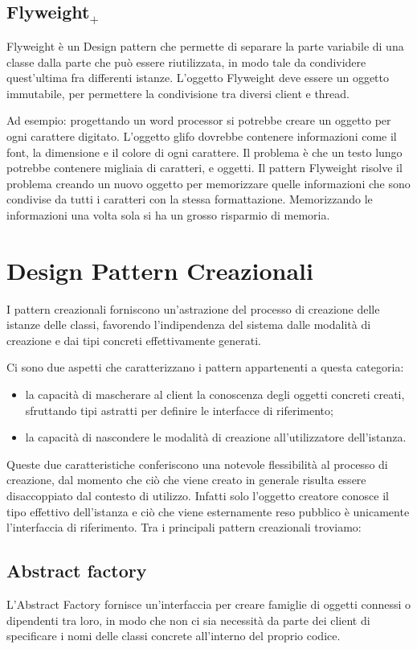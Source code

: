 \subsection{Flyweight$_+$}
Flyweight è un Design pattern che permette di separare la parte variabile di una classe dalla parte che può essere riutilizzata, in modo tale da condividere quest'ultima fra differenti istanze. L'oggetto Flyweight deve essere un oggetto immutabile, per permettere la condivisione tra diversi client e thread.

Ad esempio: progettando un word processor si potrebbe creare un oggetto per ogni carattere digitato. 
L'oggetto glifo dovrebbe contenere informazioni come il font, la dimensione e il colore di ogni carattere. 
Il problema è che un testo lungo potrebbe contenere migliaia di caratteri, e oggetti. Il pattern Flyweight risolve il problema creando un nuovo oggetto per memorizzare quelle informazioni che sono condivise da tutti i caratteri con la stessa formattazione. Memorizzando le informazioni una volta sola si ha un grosso risparmio di memoria.

\section{Design Pattern Creazionali}
I pattern creazionali forniscono un'astrazione del processo di creazione delle istanze delle classi, favorendo l'indipendenza del sistema dalle modalità di creazione e dai tipi concreti effettivamente generati.

Ci sono due aspetti che caratterizzano i pattern appartenenti a questa categoria:
\begin{itemize}
	\item la capacità di mascherare al client la conoscenza degli oggetti concreti creati, sfruttando tipi astratti per definire le interfacce di riferimento;
	\item la capacità di nascondere le modalità di creazione all'utilizzatore dell'istanza.
\end{itemize}
Queste due caratteristiche conferiscono una notevole flessibilità al processo di creazione, dal momento che ciò che viene creato in generale risulta essere disaccoppiato dal contesto di utilizzo. Infatti solo l'oggetto creatore conosce il tipo effettivo dell'istanza e ciò che viene esternamente reso pubblico è unicamente l'interfaccia di riferimento.
Tra i principali pattern creazionali troviamo:

\subsection{Abstract factory}
L'Abstract Factory fornisce un'interfaccia per creare famiglie di oggetti connessi o dipendenti tra loro, in modo che non ci sia necessità da parte dei client di specificare i nomi delle classi concrete all'interno del proprio codice.

